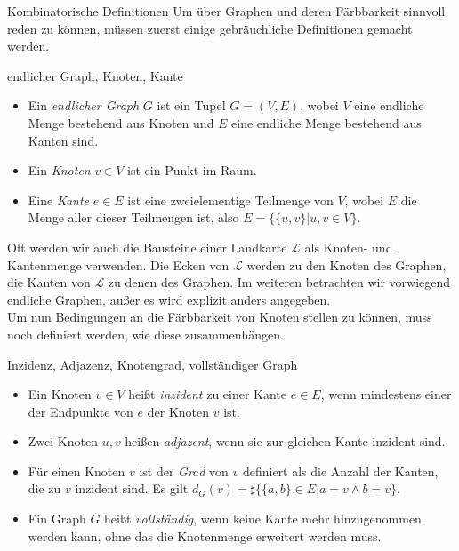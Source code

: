 \begin{section}{Kombinatorische Definitionen}
  Um über Graphen und deren Färbbarkeit sinnvoll reden zu können, müssen zuerst einige gebräuchliche Definitionen gemacht werden. 
 
  \begin{definition}{endlicher Graph, Knoten, Kante}
    \-\ 
    \begin{itemize}
    \item Ein \textit{endlicher Graph} $G$ ist ein Tupel $G=(V,E)$, wobei $V$ eine endliche Menge bestehend aus Knoten und $E$ eine endliche Menge bestehend aus Kanten sind.
    \item Ein \textit{Knoten} $v \in V$ ist ein Punkt im Raum. 
    \item Eine \textit{Kante} $e \in E$ ist eine zweielementige Teilmenge von $V$, wobei $E$ die Menge aller dieser Teilmengen ist, also $E = \{\{u,v\}|u,v \in V\}$.
    \end{itemize}
  \end{definition}
  
  Oft werden wir auch die Bausteine einer Landkarte $\mathcal{L}$ als Knoten- und Kantenmenge verwenden. Die Ecken von $\mathcal{L}$ werden zu den Knoten des Graphen, die Kanten von $\mathcal{L}$ zu denen des Graphen. Im weiteren betrachten wir vorwiegend endliche Graphen, außer es wird explizit anders angegeben.\\
  Um nun Bedingungen an die Färbbarkeit von Knoten stellen zu können, muss noch definiert werden, wie diese zusammenhängen.
 
  \begin{definition}{Inzidenz, Adjazenz, Knotengrad, vollständiger Graph}
    \-\ 
    \begin{itemize}
    \item Ein Knoten $v \in V$ heißt \textit{inzident} zu einer Kante $e \in E$, wenn mindestens einer der Endpunkte von $e$ der Knoten $v$ ist. 
    \item Zwei Knoten $u,v$ heißen \textit{adjazent}, wenn sie zur gleichen Kante inzident sind. 
    \item Für einen Knoten $v$ ist der \textit{Grad} von $v$ definiert als die Anzahl der Kanten, die zu $v$ inzident sind. Es gilt $d_G(v) = \sharp\{\{a,b\} \in E | a=v \wedge b=v \}$.
    \item Ein Graph $G$ heißt \textit{vollständig}, wenn keine Kante mehr hinzugenommen werden kann, ohne das die Knotenmenge erweitert werden muss.
   \end{itemize}
  \end{definition}
    

\end{section}
